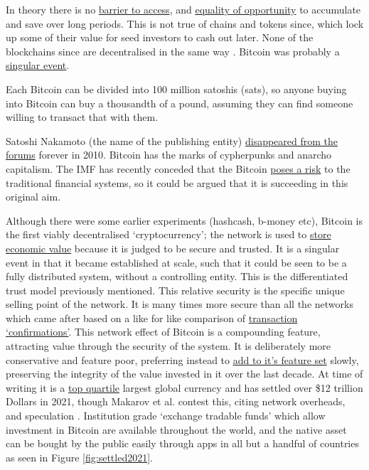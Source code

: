 In theory there is no \href{https://www.forbes.com/sites/peterizzo/2021/09/29/against-cryptocurrency-the-ethical-argument-for-bitcoin-maximalism/?}{barrier to access}, and \href{https://www.coindesk.com/layer2/2022/02/16/why-bitcoin-is-a-tool-for-social-justice/}{equality of opportunity} to accumulate and save over long periods. This is not true of chains and tokens since, which lock up some of their value for seed investors to cash out later. None of the blockchains since are decentralised in the same way \cite{selvam2021blockchain}. Bitcoin was probably a \href{https://danhedl.medium.com/bitcoins-distribution-was-fair-e2ef7bbbc892}{singular event}.\par
Each Bitcoin can be divided into 100 million satoshis (sats), so anyone buying into Bitcoin can buy a thousandth of a pound, assuming they can find someone willing to transact that with them. \par
Satoshi Nakamoto (the name of the publishing entity) \href{https://bitcoinmagazine.com/technical/what-happened-when-bitcoin-creator-satoshi-nakamoto-disappeared}{disappeared from the forums} forever in 2010. Bitcoin has the marks of cypherpunks and anarcho capitalism. The IMF has recently conceded that the Bitcoin \href{https://blogs.imf.org/2022/01/11/crypto-prices-move-more-in-sync-with-stocks-posing-new-risks/}{poses a risk} to the traditional financial systems, so it could be argued that it is succeeding in this original aim.\par
Although there were some earlier experiments (hashcash, b-money etc), Bitcoin is the first viably decentralised `cryptocurrency'; the network is used to \href{https://www.aier.org/article/why-does-bitcoin-have-value/}{store economic value} because it is judged to be secure and trusted. It is a singular event in that it became established at scale, such that it could be seen to be a fully distributed system, without a controlling entity. This is the differentiated trust model previously mentioned. This relative security is the specific unique selling point of the network. It is many times more secure than all the networks which came after based on a like for like comparison of \href{https://howmanyconfs.com/}{transaction `confirmations'}. This network effect of Bitcoin is a compounding feature, attracting value through the security of the system. It is deliberately more conservative and feature poor, preferring instead to \href{https://bips.xyz/}{add to it's feature set} slowly, preserving the integrity of the value invested in it over the last decade. At time of writing it is a \href{https://fiatmarketcap.com/}{top quartile} largest global currency and has settled over \$12 trillion Dollars in 2021, though Makarov et al. contest this, citing network overheads, and speculation \cite{makarov2021blockchain}. Institution grade `exchange tradable funds' which allow investment in Bitcoin are available throughout the world, and the native asset can be bought by the public easily through apps in all but a handful of countries as seen in Figure \ref{fig:settled2021}. \par
